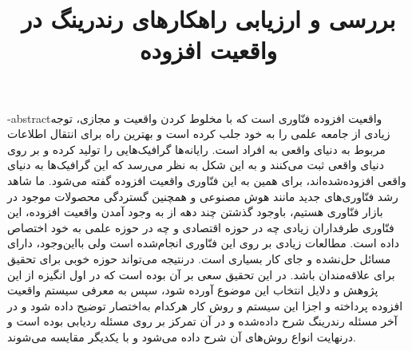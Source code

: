 \documentclass[oneside,openany,mscS]{SBU-Thesis}
\begin{document}
	\title{بررسی و ارزیابی راهکارهای رندرینگ در واقعیت افزوده}
	
	\subject{مهندسی کامپیوتر}
	
	
	
	
	


	
	
	

	\fa-abstract{واقعیت افزوده فنّاوری است که با مخلوط کردن واقعیت و مجازی، توجه زیادی از جامعه علمی را به خود جلب کرده است و بهترین راه برای انتقال اطلاعات مربوط به دنیای واقعی به افراد است. رایانه‌ها گرافیک‌هایی را تولید کرده و بر روی دنیای واقعی ثبت می‌کنند و به این شکل به نظر می‌رسد که این گرافیک‌ها به دنیای  واقعی افزوده‌شده‌اند، برای همین به این فنّاوری واقعیت افزوده گفته می‌شود.
		ما شاهد رشد فنّاوری‌های جدید مانند هوش مصنوعی و همچنین گستردگی محصولات موجود در بازار فنّاوری هستیم، باوجود گذشتن چند دهه از به وجود آمدن واقعیت افزوده، این فنّاوری طرفداران زیادی چه در حوزه اقتصادی و چه در حوزه علمی به خود اختصاص داده است.
		مطالعات زیادی بر روی این فنّاوری انجام‌شده است ولی بااین‌وجود، دارای مسائل حل‌نشده و جای کار بسیاری است. درنتیجه می‌تواند حوزه خوبی برای تحقیق برای علاقه‌مندان باشد.
		در این تحقیق سعی بر آن بوده است که در اول انگیزه از این پژوهش و دلایل انتخاب این موضوع آورده شود، سپس به معرفی سیستم واقعیت افزوده پرداخته و اجزا این سیستم و روش کار هرکدام به‌اختصار توضیح داده شود  و در آخر مسئله رندرینگ شرح داده‌شده و در آن تمرکز بر روی مسئله ردیابی بوده است و درنهایت انواع روش‌های آن شرح داده می‌شود و با یکدیگر مقایسه می‌شوند.}
	
\end{document}
